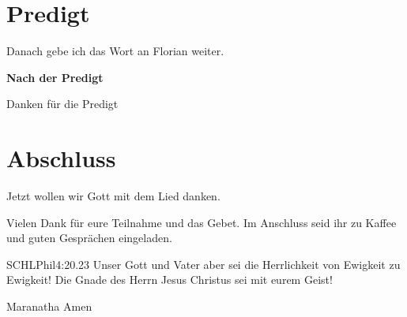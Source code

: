 \section{Predigt}

Danach gebe ich das Wort an Florian weiter.

\textbf{Nach der Predigt}

Danken für die Predigt

\section{Abschluss}

Jetzt wollen wir Gott mit dem Lied  danken.


Vielen Dank für eure Teilnahme und das Gebet. Im Anschluss seid ihr zu Kaffee und guten Gesprächen eingeladen.
\beten{}

\begin{bibelbox}{SCHL}{Phil}{4:20.23}
Unser Gott und Vater aber sei die Herrlichkeit von Ewigkeit zu Ewigkeit!
Die Gnade des Herrn Jesus Christus sei mit eurem Geist!
\end{bibelbox}

Maranatha Amen
